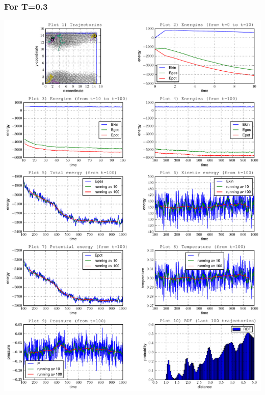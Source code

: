 \documentclass[12pt,a4paper]{scrartcl}
\begin{document}
\subsubsection*{For T=0.3}
\includegraphics[page=1, scale=0.63]{../plots/all03}
\end{document}
